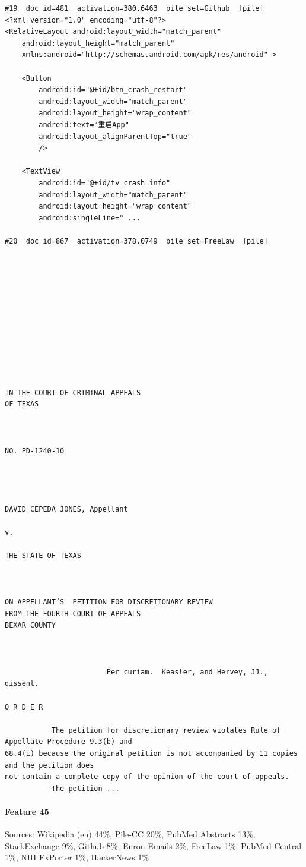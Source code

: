 \begin{verbatim}
#19  doc_id=481  activation=380.6463  pile_set=Github  [pile]
<?xml version="1.0" encoding="utf-8"?>
<RelativeLayout android:layout_width="match_parent"
    android:layout_height="match_parent"
    xmlns:android="http://schemas.android.com/apk/res/android" >

    <Button
        android:id="@+id/btn_crash_restart"
        android:layout_width="match_parent"
        android:layout_height="wrap_content"
        android:text="重启App"
        android:layout_alignParentTop="true"
        />

    <TextView
        android:id="@+id/tv_crash_info"
        android:layout_width="match_parent"
        android:layout_height="wrap_content"
        android:singleLine=" ...

#20  doc_id=867  activation=378.0749  pile_set=FreeLaw  [pile]












IN THE COURT OF CRIMINAL APPEALS
OF TEXAS



NO. PD-1240-10




DAVID CEPEDA JONES, Appellant

v.

THE STATE OF TEXAS



ON APPELLANT’S  PETITION FOR DISCRETIONARY REVIEW
FROM THE FOURTH COURT OF APPEALS
BEXAR COUNTY



                        Per curiam.  Keasler, and Hervey, JJ., dissent.

O R D E R 

           The petition for discretionary review violates Rule of Appellate Procedure 9.3(b) and
68.4(i) because the original petition is not accompanied by 11 copies and the petition does
not contain a complete copy of the opinion of the court of appeals.
           The petition ...

\end{verbatim}

\paragraph*{Feature 45} Sources: Wikipedia (en) 44\%, Pile-CC 20\%, PubMed Abstracts 13\%, StackExchange 9\%, Github 8\%, Enron Emails 2\%, FreeLaw 1\%, PubMed Central 1\%, NIH ExPorter 1\%, HackerNews 1\%

